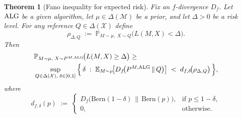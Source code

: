 \documentclass[conference]{IEEEtran}
\newtheorem{theorem}{Theorem}
\begin{document}
\begin{theorem}[Fano inequality for expected risk]
\label{thm:Fano-expected-risk}
Fix an $f$-divergence $D_f$. Let $\textup{ALG}$ be a given algorithm, let $\mu\in\Delta(\mathcal M)$ be a prior, and let $\Delta>0$ be a risk level. For any reference $Q\in\Delta(\mathcal X)$ define
\[
\rho_{\Delta,Q}\;:=\; \mathbb P_{M\sim\mu,\; X\sim Q}\!\big(L(M,X)<\Delta\big).
\]
Then
\[
\begin{aligned}
&\mathbb P_{M\sim\mu,\; X\sim P^{M,\textup{ALG}}}\!\big(L(M,X)\ge \Delta\big)
\ge
\\
&\sup_{Q\in\Delta(\mathcal X),\; \delta\in[0,1]} \Big\{\,
\delta \;:\; \mathbb{E}_{M\sim\mu}\!\big[D_f\!\big(P^{M,\textup{ALG}}\,\|\,Q\big)\big]
\;<\; d_{f,\delta}\!\big(\rho_{\Delta,Q}\big)
\,\Big\},
\end{aligned}
\]
where
\[
d_{f,\delta}(p)\;:=\;
\begin{cases}
D_f\!\big(\mathrm{Bern}(1-\delta)\,\big\|\,\mathrm{Bern}(p)\big), & \text{if } p\le 1-\delta,\\[4pt]
0, & \text{otherwise.}
\end{cases}
\]
\end{theorem}
\end{document}
